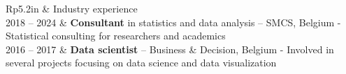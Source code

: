 \documentclass[letterpaper, 11pt]{article}
\newcommand{\headingfont}{\Large\color{OliveGreen}}
\newenvironment{SectionTable}[1]{
	\renewcommand*{\arraystretch}{1.7}
	\setlength{\tabcolsep}{10pt}
	\begin{longtable}{Rp{5.2in}} & #1 \\}
{\end{longtable}\vspace{-.3cm}}
\begin{document}

\newpage

\begin{SectionTable}{\headingfont Industry experience}

2018 -- 2024 & 
\textbf{Consultant} in statistics and data analysis -- SMCS, Belgium\newline
- Statistical consulting for researchers and academics\\ %

2016 -- 2017 &
\textbf{Data scientist} -- Business \& Decision, Belgium \newline
- Involved in several projects focusing on data science and data visualization



\end{SectionTable}






\end{document}
